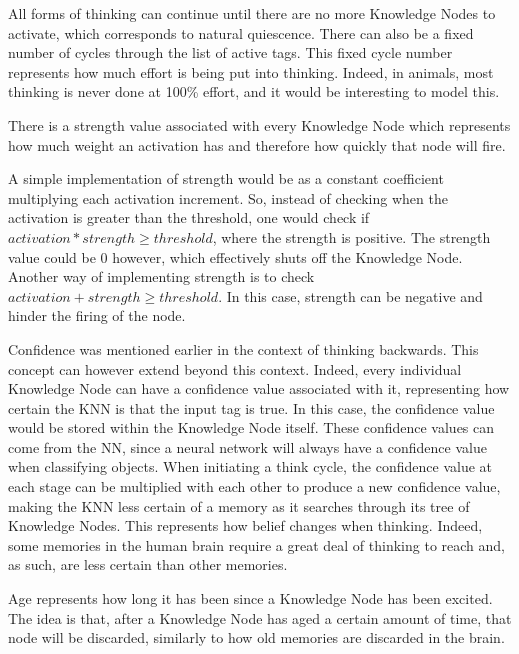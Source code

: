 \documentclass[titlepage,11pt]{article}
\begin{document}
All forms of thinking can continue until there are no more Knowledge Nodes to activate, which corresponds to natural quiescence. There can also be a fixed number of cycles through the list of active tags. This fixed cycle number represents how much effort is being put into thinking. Indeed, in animals, most thinking is never done at 100\% effort, and it would be interesting to model this.

There is a strength value associated with every Knowledge Node which represents how much weight an activation has and therefore how quickly that node will fire.

A simple implementation of strength would be as a constant coefficient multiplying each activation increment. So, instead of checking when the activation is greater than the threshold, one would check if $activation * strength \geq threshold$, where the strength is positive. The strength value could be 0 however, which effectively shuts off the Knowledge Node. Another way of implementing strength is to check $activation + strength \geq threshold$. In this case, strength can be negative and hinder the firing of the node.

Confidence was mentioned earlier in the context of thinking backwards. This concept can however extend beyond this context. Indeed, every individual Knowledge Node can have a confidence value associated with it, representing how certain the KNN is that the input tag is true. In this case, the confidence value would be stored within the Knowledge Node itself. These confidence values can come from the NN, since a neural network will always have a confidence value when classifying objects. When initiating a think cycle, the confidence value at each stage can be multiplied with each other to produce a new confidence value, making the KNN less certain of a memory as it searches through its tree of Knowledge Nodes. This represents how belief changes when thinking. Indeed, some memories in the human brain require a great deal of thinking to reach and, as such, are less certain than other memories.

Age represents how long it has been since a Knowledge Node has been excited. The idea is that, after a Knowledge Node has aged a certain amount of time, that node will be discarded, similarly to how old memories are discarded in the brain.
\end{document}
